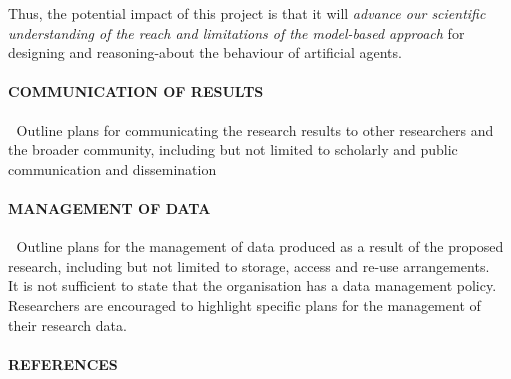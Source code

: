 \documentclass[a4paper,12pt,smallheadings]{scrartcl}
\begin{document}


Thus, the potential impact of this project is that it will \emph{advance our scientific understanding of the reach and limitations of the model-based approach} for designing and reasoning-about the behaviour of artificial agents.


\paragraph{COMMUNICATION OF RESULTS}


Outline plans for communicating the research results to other researchers and the
broader community, including but not limited to scholarly and public communication
and dissemination

\paragraph{MANAGEMENT OF DATA}
 Outline plans for the management of data produced as a result of the proposed
research, including but not limited to storage, access and re-use arrangements.
 It is not sufficient to state that the organisation has a data management policy.
Researchers are encouraged to highlight specific plans for the management of their
research data.

\paragraph{REFERENCES}



\end{document}
